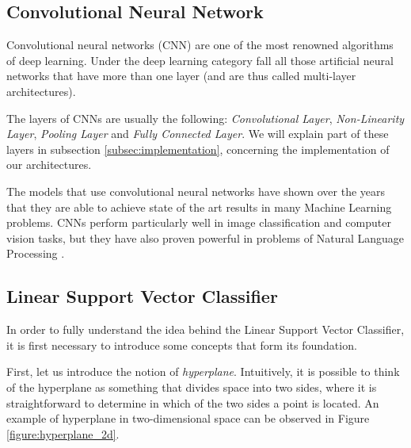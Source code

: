\documentclass[letterpaper,11pt]{article}
\begin{document}
\subsection{Convolutional Neural Network}

Convolutional neural networks (CNN) are one of the most renowned algorithms of deep learning. Under the deep learning category fall all those artificial neural networks that have more than one layer (and are thus called multi-layer architectures).

The layers of CNNs are usually the following: \textit{Convolutional Layer}, \textit{Non-Linearity Layer}, \textit{Pooling Layer} and \textit{Fully Connected Layer}. We will explain part of these layers in subsection \ref{subsec:implementation}, concerning the implementation of our architectures.

The models that use convolutional neural networks have shown over the years that they are able to achieve state of the art results in many Machine Learning problems. CNNs perform particularly well in image classification and computer vision tasks, but they have also proven powerful in problems of Natural Language Processing \cite{Albawi2017UnderstandingOA}.

\subsection{Linear Support Vector Classifier}

In order to fully understand the idea behind the Linear Support Vector Classifier, it is first necessary to introduce some concepts that form its foundation.

First, let us introduce the notion of \textit{hyperplane}. Intuitively, it is possible to think of the hyperplane as something that divides space into two sides, where it is straightforward to determine in which of the two sides a point is located. An example of hyperplane in two-dimensional space can be observed in Figure \ref{figure:hyperplane_2d}.
\end{document}
